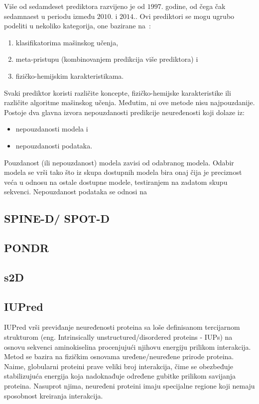 Više od sedamdeset prediktora razvijeno je od $1997.$ godine, od čega čak sedamnaest u periodu između $2010.$ i $2014.$. Ovi prediktori se mogu ugrubo podeliti u nekoliko kategorija, one bazirane na~\cite{PredictorsOverview}:
\begin{enumerate}
\item klasifikatorima mašinskog učenja,
\item meta-pristupu (kombinovanjem predikcija više prediktora) i 
\item fizičko-hemijskim karakteristikama.
\end{enumerate}

Svaki prediktor koristi različite koncepte, fizičko-hemijske karakteristike ili različite algoritme mašinskog učenja. Međutim, ni ove metode nisu najpouzdanije. Postoje dva glavna izvora nepouzdanosti predikcije neuređenosti koji dolaze iz:
\begin{itemize}
\item nepouzdanosti modela i
\item nepouzdanosti podataka.
\end{itemize}

Pouzdanost (ili nepouzdanost) modela zavisi od odabranog modela. Odabir modela se vrši tako što iz skupa dostupnih modela bira onaj čija je preciznost veća u odnosu na ostale dostupne modele, testiranjem na zadatom skupu sekvenci.
Nepouzdanost podataka se odnosi na  ~\cite{MolBioSyst}


\subsection{SPINE-D/ SPOT-D}



\subsection{PONDR}

\subsection{s2D}
\subsection{IUPred}
IUPred vrši previđanje neuređenosti proteina sa loše definisanom tercijarnom strukturom (eng. Intrinsically unstructured/disordered proteins - IUPs) na osnovu sekvenci aminokiselina procenjujući njihovu energiju prilikom interakcija. Metod se bazira na fizičkim osnovama uređene/neuređene prirode proteina. Naime, globularni proteini prave veliki broj interakcija, čime se obezbeđuje stabilizujuća energija koja nadoknađuje određene gubitke prilikom savijanja proteina. Nasuprot njima, neuređeni proteini imaju specijalne regione koji nemaju sposobnost kreiranja interakcija.\\\\

